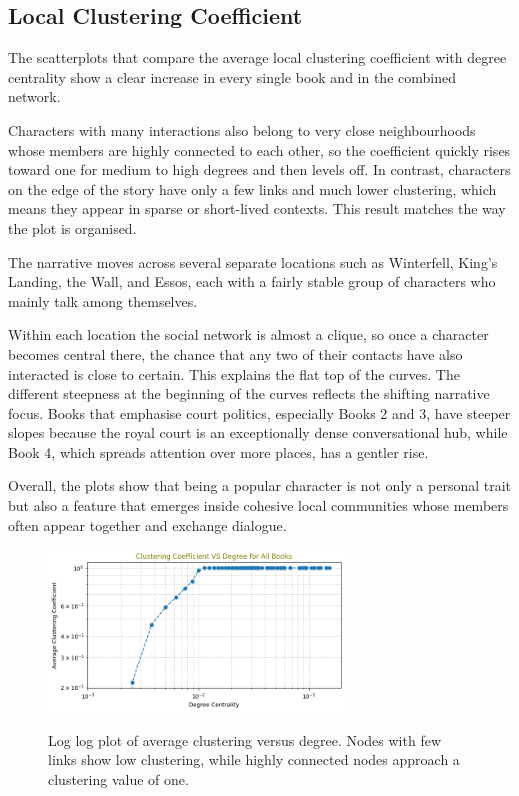 \documentclass[12pt, a4paper]{article}
\begin{document}
	\subsection*{Local Clustering Coefficient}
	The scatterplots that compare the average local clustering coefficient 
	with degree centrality show a clear increase in every single book and in the combined network.
	
	Characters with many interactions also belong to very close neighbourhoods whose members
	are highly connected to each other, so the coefficient quickly rises toward one for medium
	to high degrees and then levels off. In contrast, characters on the edge of the story 
	have only a few links and much lower clustering, which means they appear in sparse or 
	short-lived contexts. This result matches the way the plot is organised. 
	
	The narrative moves across several separate locations such as Winterfell, King's Landing, 
	the Wall, and Essos, each with a fairly stable group of characters who mainly talk among 
	themselves.
	
	Within each location the social network is almost a clique, 
	so once a character becomes central there, the chance that any 
	two of their contacts have also interacted is close to certain. 
	This explains the flat top of the curves.
	The different steepness at the beginning of the curves reflects the shifting narrative focus.
	Books that emphasise court politics, especially Books 2 and 3, 
	have steeper slopes because the royal court is an exceptionally 
	dense conversational hub, while Book 4, which spreads attention over more places, 
	has a gentler rise. 
	
	Overall, the plots show that being a popular character is not only a personal trait but also a feature that emerges inside cohesive local communities whose members often appear together and exchange dialogue.
	
	\begin{figure}[htbp]
		\centering
		\includegraphics[width=0.7\textwidth]{local_clust_all_books.png}
		\label{fig:localclustcoeff}
		\caption{
			Log log plot of average clustering versus degree. Nodes with few links show low clustering, while highly connected nodes approach a clustering value of one.            }
	\end{figure}
	\FloatBarrier
\end{document}
